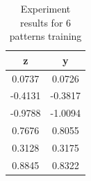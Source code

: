\documentclass{classrep}
\begin{document}
{{            \begin{table}[!htbp]
                \centering
                \begin{tabular}{|c|c|}
                    \hline
                    z & y \\ \hline
                    0.0737 & 0.0726 \\
                    -0.4131 & -0.3817 \\
                    -0.9788 & -1.0094 \\
                    0.7676 & 0.8055 \\
                    0.3128 & 0.3175 \\
                    0.8845 & 0.8322 \\ \hline
                \end{tabular}
                \caption{Experiment results for 6 patterns training}
                \label{tab:results:multiple:m6}
            \end{table}
            \FloatBarrier
        }
    }
\end{document}
